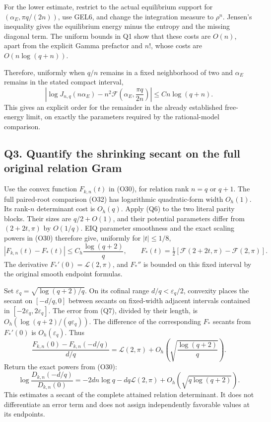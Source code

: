 For the lower estimate, restrict to the actual equilibrium support for
\((\alpha_E,\pi q/(2n))\), use GEL6, and change the integration measure
to \(\rho^n\). Jensen's inequality gives the equilibrium energy minus
the entropy and the missing diagonal term. The uniform bounds in Q1 show
that these costs are \(O(n)\), apart from the explicit Gamma prefactor
and \(n!\), whose costs are \(O(n\log(q+n))\).

Therefore, uniformly when \(q/n\) remains in a fixed neighborhood of two
and \(\alpha_E\) remains in the stated compact interval, \[
\boxed{\left|\log J_{n,q}(n\alpha_E)
-n^2\mathcal F\!\left(\alpha_E,\frac{\pi q}{2n}\right)\right|
\le C n\log(q+n).}
\tag{Q6}
\] This gives an explicit order for the remainder in the already
established free-energy limit, on exactly the parameters required by the
rational-model comparison.

\subsection{Q3. Quantify the shrinking secant on the full original
relation
Gram}\label{sa:q3.-quantify-the-shrinking-secant-on-the-full-original-relation-gram}

Use the convex function \(F_{k,n}(t)\) in (O30), for relation rank
\(n=q\) or \(q+1\). The full paired-root comparison (O32) has
logarithmic quadratic-form width \(O_h(1)\). Its rank-\(n\) determinant
cost is \(O_h(q)\). Apply (Q6) to the two literal parity blocks. Their
sizes are \(q/2+O(1)\), and their potential parameters differ from
\((2+2t,\pi)\) by \(O(1/q)\). EIQ parameter smoothness and the exact
scaling powers in (O30) therefore give, uniformly for \(|t|\le1/8\), \[
\boxed{\left|F_{k,n}(t)-F_*(t)\right|\le C_h\frac{\log(q+2)}q,
\qquad
F_*(t)=\tfrac12[\mathcal F(2+2t,\pi)-\mathcal F(2,\pi)].}
\tag{Q7}
\] The derivative \(F_*'(0)=\mathcal L(2,\pi)\), and \(F_*''\) is
bounded on this fixed interval by the original smooth endpoint formulas.

Set \(\varepsilon_q=\sqrt{\log(q+2)/q}\). On its cofinal range
\(d/q<\varepsilon_q/2\), convexity places the secant on \([-d/q,0]\)
between secants on fixed-width adjacent intervals contained in
\([-2\varepsilon_q,2\varepsilon_q]\). The error from (Q7), divided by
their length, is \(O_h(\log(q+2)/(q\varepsilon_q))\). The difference of
the corresponding \(F_*\) secants from \(F_*'(0)\) is
\(O_h(\varepsilon_q)\). Thus \[
\frac{F_{k,n}(0)-F_{k,n}(-d/q)}{d/q}
=\mathcal L(2,\pi)+O_h\!\left(\sqrt{\frac{\log(q+2)}q}\right).
\] Return the exact powers from (O30): \[
\boxed{\log\frac{D_{k,n}(-d/q)}{D_{k,n}(0)}
=-2dn\log q-dq\mathcal L(2,\pi)
+O_h(\sqrt{q\log(q+2)}).}
\tag{Q8}
\] This estimates a secant of the complete attained relation
determinant. It does not differentiate an error term and does not assign
independently favorable values at its endpoints.


